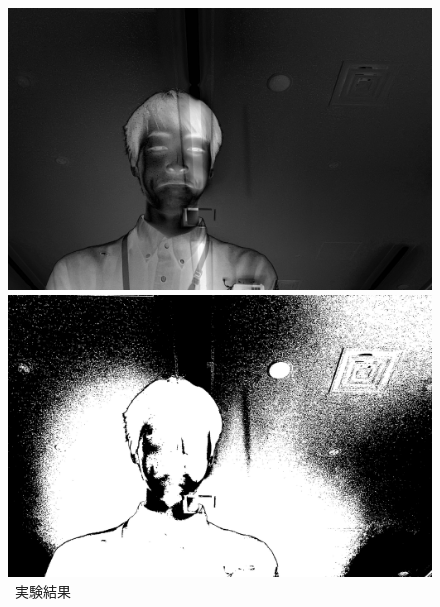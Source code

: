 \begin{figure}[H]
\begin{minipage}[b]{.49\textwidth}
\begin{minipage}[b]{.3\textwidth}
            \includegraphics[keepaspectratio,width=\textwidth]{../../Figures/05_60.png}
        \end{minipage}
        \caption{\kadaiaf\ 実験結果}
    \end{minipage}
    \nextfloat
    \begin{minipage}[b]{.49\textwidth}
        \centering
        \begin{minipage}[b]{.3\textwidth}
            \centering
            \includegraphics[keepaspectratio,width=\textwidth]{../../Figures/05_61.png}
        \end{minipage}
        \begin{minipage}[b]{.3\textwidth}
            \centering

\end{minipage}
\end{minipage}
\end{figure}

